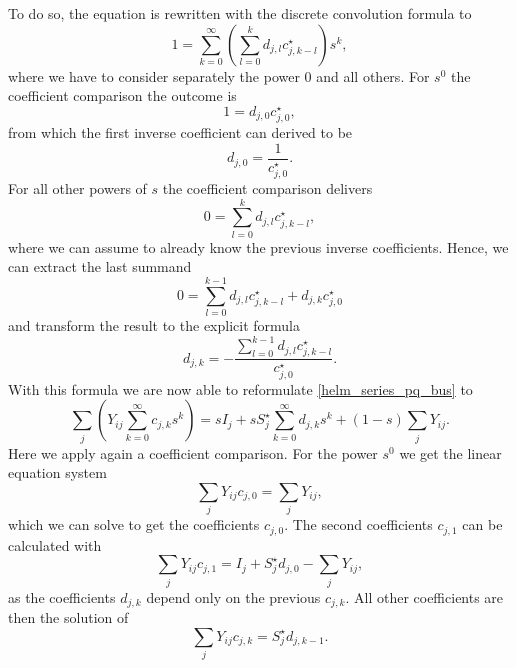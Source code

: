 To do so, the equation is rewritten with the discrete convolution formula to
\begin{equation}
	1 = \sum_{k = 0}^\infty \left( \sum_{l = 0}^k d_{j,l} c_{j,k - l}^\star \right) s^k,
\end{equation}
where we have to consider separately the power 0 and all others. For $s^0$ the coefficient comparison the outcome is
\begin{equation}
	1 = d_{j,0} c_{j,0}^\star,
\end{equation}
from which the first inverse coefficient can derived to be
\begin{equation}
	d_{j,0} = \frac{1}{c_{j,0}^\star}.
\end{equation}
For all other powers of $s$ the coefficient comparison delivers
\begin{equation}
	0 = \sum_{l = 0}^k d_{j,l} c_{j,k - l}^\star,
\end{equation}
where we can assume to already know the previous inverse coefficients. Hence, we can extract the last summand
\begin{equation}
	0 = \sum_{l = 0}^{k - 1} d_{j,l} c_{j,k - l}^\star + d_{j,k} c_{j,0}^\star
\end{equation}
and transform the result to the explicit formula 
\begin{equation}
	d_{j,k} = - \frac{\sum_{l = 0}^{k - 1} d_{j,l} c_{j,k - l}^\star}{c_{j,0}^\star}.
\end{equation}
With this formula we are now able to reformulate \eqref{helm_series_pq_bus} to
\begin{equation}
	\sum_j \left( Y_{ij} \sum_{k = 0}^\infty c_{j,k} s^k \right) = s I_j + s S_j^\star \sum_{k = 0}^\infty d_{j,k} s^k + (1 - s) \sum_j Y_{ij}.
\end{equation}
Here we apply again a coefficient comparison. For the power $s^0$ we get the linear equation system
\begin{equation}
	\sum_j Y_{ij} c_{j,0} = \sum_j Y_{ij},
	\label{eq:helm_first_coefficients}
\end{equation}
which we can solve to get the coefficients $c_{j,0}$. The second coefficients $c_{j,1}$ can be calculated with
\begin{equation}
	\sum_j Y_{ij} c_{j,1} = I_j + S_j^\star d_{j,0} - \sum_j Y_{ij},
	\label{eq:helm_second_coefficients}
\end{equation}
as the coefficients $d_{j,k}$ depend only on the previous $c_{j,k}$. All other coefficients are then the solution of
\begin{equation}
	\sum_j Y_{ij} c_{j,k} = S_j^\star d_{j,k - 1}.
	\label{eq:helm_other_coefficients}
\end{equation}

